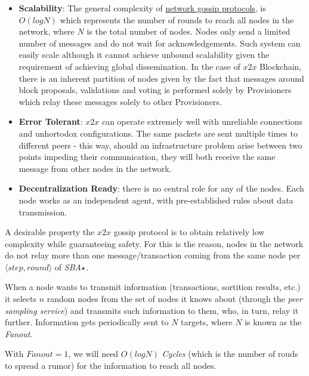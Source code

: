 \begin{itemize}
\item
  \textbf{Scalability}: The general complexity of
  \href{https://pdfs.semanticscholar.org/3df0/523ff58d8dec53e89a521831265af32f52d6.pdf}{network
  gossip protocols}, is
  \href{https://arxiv.org/pdf/1512.03022.pdf}{\(O(logN)\)} which
  represents the number of rounds to reach all nodes in the network,
  where \(N\) is the total number of nodes. Nodes only send a limited
  number of messages and do not wait for acknowledgements. Such system
  can easily scale although it cannot achieve unbound scalability given
  the requirement of achieving global dissemination. In the case of
  \(x2x\) Blockchain, there is an inherent partition of nodes given by
  the fact that messages around block proposals, validations and voting
  is performed solely by Provisioners which relay these messages solely
  to other Provisioners.
\item
  \textbf{Error Tolerant}: \(x2x\) can operate extremely well with
  unreliable connections and unhortodox configurations. The same packets
  are sent multiple times to different peers - this way, should an
  infrastructure problem arise between two points impeding their
  communication, they will both receive the same message from other
  nodes in the network.
\item
  \textbf{Decentralization Ready}: there is no central role for any of
  the nodes. Each node works as an independent agent, with
  pre-established rules about data transmission.
\end{itemize}



A desirable property the \(x2x\) gossip protocol is to obtain relatively
low complexity while guaranteeing safety. For this is the reason, nodes
in the network do not relay more than one message/transaction coming
from the same node per \(\langle step, round \rangle\) of
\emph{SBA}\(\large\star\).

When a node wants to transmit information (transactions, sortition
results, etc.) it selects \(n\) random nodes from the set of nodes it
knows about (through the \emph{peer sampling service}) and transmits
such information to them, who, in turn, relay it further. Information
gets periodically sent to \(N\) targets, where \(N\) is known as the
\emph{Fanout}.

With \(Fanout=1\), we will need \(O(log N)\) \emph{Cycles} (which is the
number of rouds to spread a rumor) for the information to reach all
nodes.

